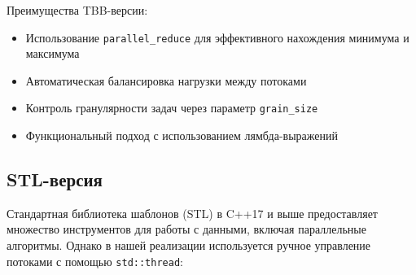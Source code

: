 \documentclass[a4paper,14pt]{article}
\begin{document}
Преимущества TBB-версии:
\begin{itemize}
    \item Использование \texttt{parallel\_reduce} для эффективного нахождения минимума и максимума
    \item Автоматическая балансировка нагрузки между потоками
    \item Контроль гранулярности задач через параметр \texttt{grain\_size}
    \item Функциональный подход с использованием лямбда-выражений
\end{itemize}

\subsection{STL-версия}

Стандартная библиотека шаблонов (STL) в C++17 и выше предоставляет множество инструментов 
для работы с данными, включая параллельные алгоритмы. Однако в нашей реализации используется 
ручное управление потоками с помощью \texttt{std::thread}:
\end{document}
